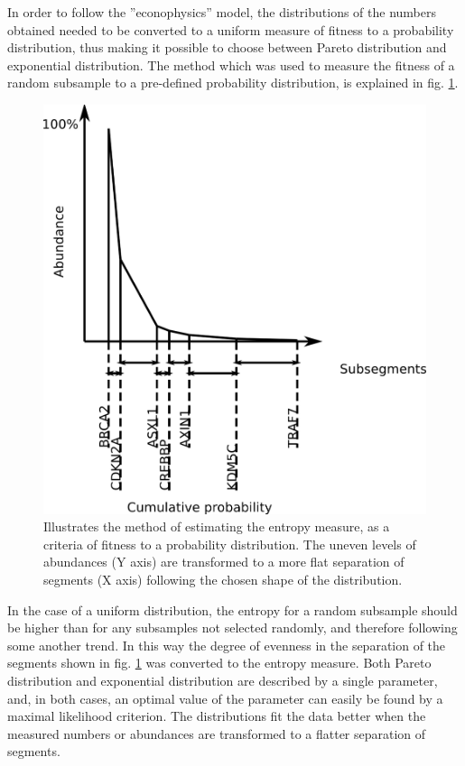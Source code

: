 \documentclass[12pt,aps]{revtex4}
\begin{document}
In order to follow the ''econophysics'' model, the distributions of the numbers obtained needed to be converted to a uniform measure of fitness to a probability distribution, thus making it possible to choose between Pareto distribution and exponential distribution. The method which was used to measure the fitness of a random subsample to a pre-defined probability distribution, is explained in fig. \ref{onco_entropyscheme}.

\begin{figure}[h]
\centerline{\includegraphics[width=0.7\columnwidth]{onco_entropyscheme.png}}
\caption{Illustrates the method of estimating the entropy measure, as a criteria of fitness to a probability distribution. The uneven levels of abundances (Y axis) are transformed to a more flat separation of segments (X axis) following the chosen shape of the distribution.}
\label{onco_entropyscheme}
\end{figure}

In the case of a uniform distribution, the entropy for a random subsample should be higher than for any subsamples not selected randomly, and therefore following some another trend. In this way the degree of evenness in the separation of the segments shown in fig. \ref{onco_entropyscheme} was converted to the entropy measure. Both Pareto distribution and exponential distribution are described by a single parameter, and, in both cases, an optimal value of the parameter can easily be found by a maximal likelihood criterion. The distributions fit the data better when the measured numbers or abundances are transformed to a flatter separation of segments.
\end{document}
